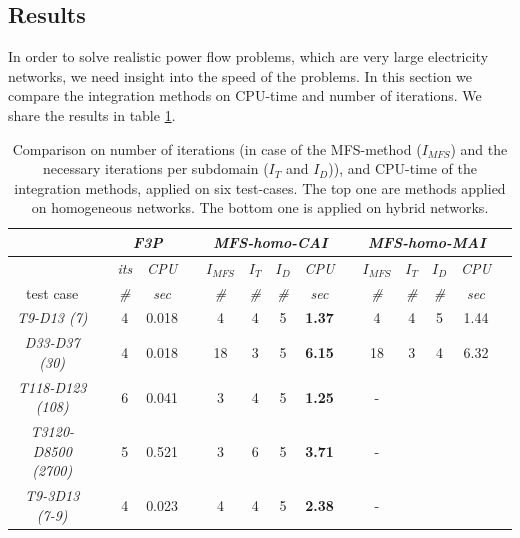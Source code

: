 \documentclass[10pt,journal]{article}
\begin{document}
\subsection{Results}
In order to solve realistic power flow problems, which are very large electricity networks, we need insight into the speed of the problems. In this section we compare the integration methods on CPU-time and number of iterations. We share the results in table \ref{tab:speed}. 
\begin{table}[h!]
\renewcommand{\arraystretch}{1.3}
\centering
\caption{Comparison on number of iterations (in case of the MFS-method ($I_{MFS}$) and the necessary iterations per subdomain ($I_T$ and $I_D$)), and CPU-time of the integration methods, applied on six test-cases. The top one are methods applied on homogeneous networks. The bottom one is applied on hybrid networks. }\label{tab:speed}
\begin{adjustbox}{width=\textwidth} %
\small
\begin{tabular}{@{}l c cc c  cccc c cccc c  @{}}\toprule
                               && \multicolumn{2}{c}{\textit{F3P}} &&     \multicolumn{4}{c}{\textit{MFS-homo-CAI}} && \multicolumn{4}{c}{\textit{MFS-homo-MAI}} \\ \midrule 
\multicolumn{1}{l}{}        && \textit{its}      & \textit{CPU} && $I_{MFS}$      & $I_T$   &  $I_D$      & \textit{CPU}     &&$I_{MFS}$      & $I_T$   &  $I_D$      & \textit{CPU}      \\
\cmidrule{3-4}  \cmidrule{6-9}  \cmidrule{11-14}   
\multicolumn{1}{c}{test case}      && \textit{\#}       & \textit{sec} && \textit{\#}      & \textit{\#}    & \textit{\#}       & \textit{sec}     && \textit{\#}        & \textit{\#}     &  \textit{\#}       & \textit{sec}  \\
\midrule
\multicolumn{1}{c}{\textit{T9-D13 (7)}}           && 4  & {0.018}    && 4  & 4 & 5 &  \textbf{1.37} && 4  & 4 & 5 & {1.44}\\
\multicolumn{1}{c}{\textit{D33-D37 (30)}}         && 4  & {0.018}    && 18 & 3 & 5 &  \textbf{6.15} && 18  & 3 & 4  & {6.32}\\
\multicolumn{1}{c}{{\textit{T118-D123 (108)}}}    && 6  & {0.041}    && 3  & 4 & 5 &  \textbf{1.25} && -  &  &  &    \\
\multicolumn{1}{c}{{\textit{T3120-D8500 (2700)}}} && 5  & {0.521}    && 3  & 6 & 5 &  \textbf{3.71} && -  &  &  &  \\
\multicolumn{1}{c}{{\textit{T9-3D13 (7-9)}}}      && 4  & {0.023}    && 4  & 4 & 5 &  \textbf{2.38} && -  &  &  &      \\

\end{tabular}
\end{adjustbox}
\end{table}
\end{document}
